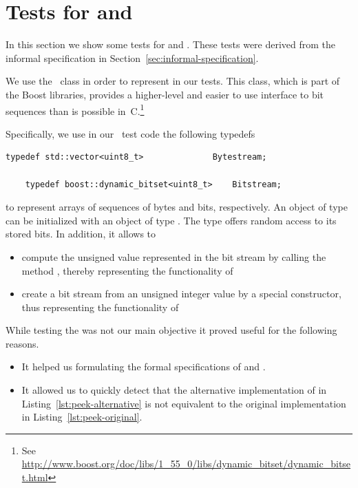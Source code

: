 \clearpage

\clearpage

\section{Tests for \peek and \poke}
\label{sec:bitwalker-tests}

In this section we show some tests for \peek and \poke.
These tests were derived from the informal specification in 
Section~\ref{sec:informal-specification}.

We use the \CC\ class  in order to represent
 in our tests.
This class, which is part of the \textsf{Boost} libraries, provides a higher-level and 
easier to use interface to bit sequences than is possible in~C.\footnote{%
  See \url{http://www.boost.org/doc/libs/1_55_0/libs/dynamic_bitset/dynamic_bitset.html}
}

Specifically, we use in our \CC\ test code the following typedefs

\begin{lstlisting}[style = acsl-block]
    typedef std::vector<uint8_t>              Bytestream;

    typedef boost::dynamic_bitset<uint8_t>    Bitstream;
\end{lstlisting}

to represent arrays of sequences of bytes and bits, respectively.
An object of type  can be initialized with an object
of type . The type  offers random access
to its stored bits.
In addition, it allows to
\begin{itemize}
\item  compute the unsigned value represented in the bit stream by calling the
       method , thereby representing the functionality of \peek
\item  create a bit stream from an unsigned integer value by a special constructor,
       thus representing the functionality of \poke
\end{itemize}

While testing the \bitwalker was not our main objective it proved useful for
the following reasons.

\begin{itemize}
\item It helped us formulating the formal specifications of \peek and \poke.
  
\item It allowed us to quickly detect that the alternative implementation of
      \peek in Listing~\ref{lst:peek-alternative} is not equivalent to the
      original implementation in Listing~\ref{lst:peek-original}.
\end{itemize}


